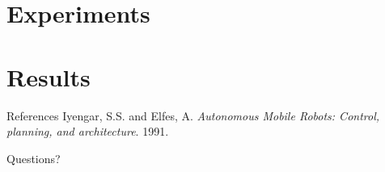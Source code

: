 \documentclass{beamer}
\begin{document}
\section{Experiments}

\section{Results}

\begin{thebibliography}{9}

	\begin{frame}{References}
			Iyengar, S.S. and Elfes, A.
			\emph{Autonomous Mobile Robots: Control, planning, and architecture}.
			1991.
			
 	\end{frame}
 	
	\begin{frame}{}
	\begin{alertblock}{}
		\center
		Questions?
	\end{alertblock}
	\end{frame} 	
 	
\end{thebibliography}
 	
\end{document}
